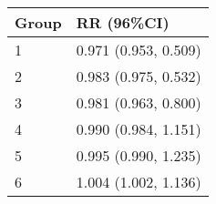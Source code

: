 \begin{tabular}{ll}
  \hline
Group & RR (96\%CI) \\ 
  \hline
   1 & 0.971 (0.953, 0.509) \\ 
     2 & 0.983 (0.975, 0.532) \\ 
     3 & 0.981 (0.963, 0.800) \\ 
     4 & 0.990 (0.984, 1.151) \\ 
     5 & 0.995 (0.990, 1.235) \\ 
     6 & 1.004 (1.002, 1.136) \\ 
   \hline
\end{tabular}

